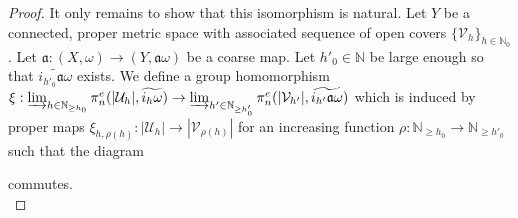 \documentclass[a4paper,11pt]{article}
\theoremstyle{definition}
\theoremstyle{plain}
\theoremstyle{remark}
\begin{document}
{\begin{proof} It only remains to show that this isomorphism is natural. Let $Y$ be a connected, proper metric space with associated sequence of open covers $\{\mathcal{V}_{h}\}_{h\in \mathbb{N}_{0}}$. Let $\mathfrak{a}: (X,\omega)\rightarrow (Y,\mathfrak{a}\omega)$ be a coarse map. Let $h'_{0}\in \mathbb{N}$ be large enough so that $\widetilde{i_{h'_{0}}\mathfrak{a}\omega}$ exists.  We define a group homomorphism $\xi: \varinjlim_{h\in \mathbb{N}_{\geq h_0}} \pi^{e}_{n}(|\mathcal{U}_{h}|, \widetilde{i_{h}\omega}) \rightarrow
\varinjlim_{h'\in \mathbb{N}_{\geq h'_0}} \pi^{e}_{n}(|\mathcal{V}_{h'}|,  \widetilde{i_{h'}\mathfrak{a}\omega})$ which is induced by proper maps $\xi_{h,\rho(h)}: |\mathcal{U}_{h}|\rightarrow |\mathcal{V}_{\rho(h)}|$ for an increasing function $\rho:\mathbb{N}_{\geq h_0}\rightarrow \mathbb{N}_{\geq h'_{0}}$ such that the diagram 

\begin{figure}[H]
\center
{}
\end{figure}
commutes. \\


\end{proof}}
\end{document}
